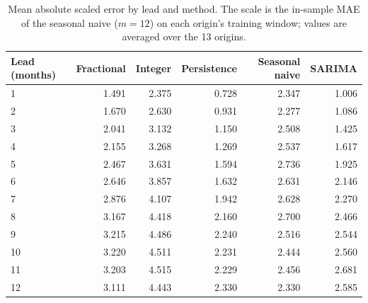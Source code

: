 \begin{table}[htbp]
\centering
\small
\caption{Mean absolute scaled error by lead and method. The scale is the in-sample MAE of the seasonal naive ($m=12$) on each origin's training window; values are averaged over the 13 origins.}
\label{tab:mase_h}
\begingroup\setlength{\tabcolsep}{6pt}
\begin{tabular}{@{}lrrrrr@{}}
\toprule
Lead (months) & Fractional & Integer & Persistence & Seasonal naive & SARIMA \\
\midrule
1 & 1.491 & 2.375 & 0.728 & 2.347 & 1.006 \\
2 & 1.670 & 2.630 & 0.931 & 2.277 & 1.086 \\
3 & 2.041 & 3.132 & 1.150 & 2.508 & 1.425 \\
4 & 2.155 & 3.268 & 1.269 & 2.537 & 1.617 \\
5 & 2.467 & 3.631 & 1.594 & 2.736 & 1.925 \\
6 & 2.646 & 3.857 & 1.632 & 2.631 & 2.146 \\
7 & 2.876 & 4.107 & 1.942 & 2.628 & 2.270 \\
8 & 3.167 & 4.418 & 2.160 & 2.700 & 2.466 \\
9 & 3.215 & 4.486 & 2.240 & 2.516 & 2.544 \\
10 & 3.220 & 4.511 & 2.231 & 2.444 & 2.560 \\
11 & 3.203 & 4.515 & 2.229 & 2.456 & 2.681 \\
12 & 3.111 & 4.443 & 2.330 & 2.330 & 2.585 \\
\bottomrule
\end{tabular}
\endgroup
\end{table}
